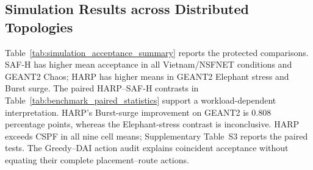 \documentclass[final,5p]{elsarticle}
\newcommand{\rev}[1]{\textcolor{revisiongreen}{#1}}
\let\newrev\rev
\begin{document}
\subsection{Simulation Results across Distributed Topologies}
\label{subsec:simulation_results}
\newrev{Table~\ref{tab:simulation_acceptance_summary} reports the protected comparisons. SAF-H has higher mean acceptance in all Vietnam/NSFNET conditions and GEANT2 Chaos; HARP has higher means in GEANT2 Elephant stress and Burst surge. The paired HARP--SAF-H contrasts in Table~\ref{tab:benchmark_paired_statistics} support a workload-dependent interpretation. HARP's Burst-surge improvement on GEANT2 is 0.808 percentage points, whereas the Elephant-stress contrast is inconclusive. HARP exceeds CSPF in all nine cell means; Supplementary Table~S3 reports the paired tests. The Greedy--DAI action audit explains coincident acceptance without equating their complete placement--route actions.}
\end{document}
